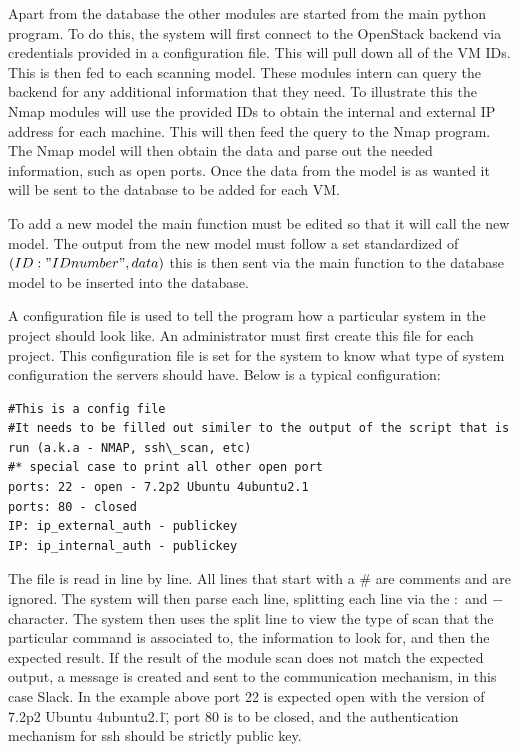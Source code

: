 \documentclass[12pt]{article}
\begin{document}
Apart from the database the other modules are started from the main python program. To do this, the system will first connect to the OpenStack backend via credentials provided in a configuration file. This will pull down all of the VM IDs. This is then fed to each scanning model. These modules intern can query the backend for any additional information that they need. To illustrate this the Nmap modules will use the provided IDs to obtain the internal and external IP address for each machine. This will then feed the query to the Nmap program. The Nmap model will then obtain the data and parse out the needed information, such as open ports. Once the data from the model is as wanted it will be sent to the database to be added for each VM.

To add a new model the main function must be edited so that it will call the new model. The output from the new model must follow a set standardized of $(ID: "ID number", data)$ this is then sent via the main function to the database model to be inserted into the database.

A configuration file is used to tell the program how a particular system in the project should look like.  An administrator must first create this file for each project. This configuration file is set for the system to know what type of system configuration the servers should have. Below is a typical configuration:

\begin{mdframed}
    \begin{lstlisting}
#This is a config file
#It needs to be filled out similer to the output of the script that is run (a.k.a - NMAP, ssh\_scan, etc)
#* special case to print all other open port
ports: 22 - open - 7.2p2 Ubuntu 4ubuntu2.1
ports: 80 - closed
IP: ip_external_auth - publickey
IP: ip_internal_auth - publickey
    \end{lstlisting}
\end{mdframed}
The file is read in line by line. All lines that start with a \# are comments and are ignored. The system will then parse each line, splitting each line via the $:$ and $-$ character. The system then uses the split line to view the type of scan that the particular command is associated to, the information to look for, and then the expected result. If the result of the module scan does not match the expected output, a message is created and sent to the communication mechanism, in this case Slack. In the example above port 22 is expected open with the version of \"7.2p2 Ubuntu 4ubuntu2.1\", port 80 is to be closed, and the authentication mechanism for ssh should be strictly public key.
\end{document}
